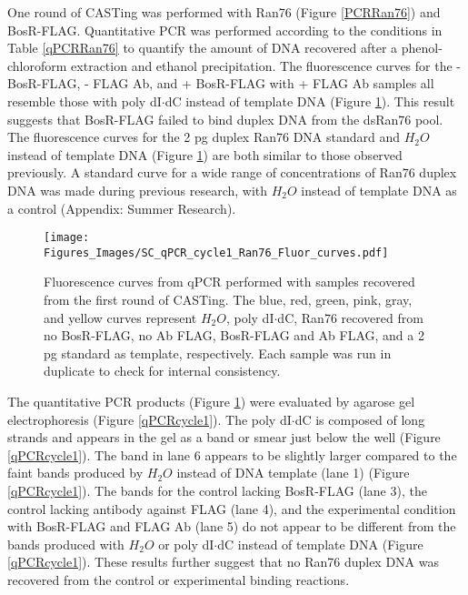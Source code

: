 \documentclass[12pt,twoside]{reedthesis}
\begin{document}
       One round of CASTing was performed with Ran76 (Figure \ref{PCRRan76}) and BosR-FLAG. Quantitative PCR was performed according to the conditions in Table \ref{qPCRRan76} to quantify the amount of DNA recovered after a phenol-chloroform extraction and ethanol precipitation. The fluorescence curves for the - BosR-FLAG, - FLAG Ab, and + BosR-FLAG with + FLAG Ab samples all resemble those with poly dI$\cdot$dC instead of template DNA (Figure \ref{qPCRcycle1fluorcurves}). This result suggests that BosR-FLAG failed to bind duplex DNA from the dsRan76 pool. The fluorescence curves for the 2 pg duplex Ran76 DNA standard and $H_{2}O$ instead of template DNA (Figure \ref{qPCRcycle1fluorcurves}) are both similar to those observed previously. A standard curve for a wide range of concentrations of Ran76 duplex DNA was made during previous research, with $H_{2}O$ instead of template DNA as a control (Appendix: Summer Research).
       
       
    \begin{figure}[t]
    	\centering
    	\texttt{[image: Figures\_Images/SC\_qPCR\_cycle1\_Ran76\_Fluor\_curves.pdf]}
    	\caption[qPCR of 1st Cycle of CASTing Fluorescence Curves]{Fluorescence curves from qPCR performed with samples recovered from the first round of CASTing. The blue, red, green, pink, gray, and yellow curves represent $H_{2}O$, poly dI$\cdot$dC, Ran76 recovered from no BosR-FLAG, no Ab FLAG, BosR-FLAG and Ab FLAG, and a 2 pg standard as template, respectively. Each sample was run in duplicate to check for internal consistency.}
    	\label{qPCRcycle1fluorcurves}
    \end{figure}
    
    
    The quantitative PCR products (Figure \ref{qPCRcycle1fluorcurves}) were evaluated by agarose gel electrophoresis (Figure \ref{qPCRcycle1}). The poly dI$\cdot$dC is composed of long strands and appears in the gel as a band or smear just below the well (Figure \ref{qPCRcycle1}). The band in lane 6 appears to be slightly larger compared to the faint bands produced by $H_{2}O$ instead of DNA template (lane 1) (Figure \ref{qPCRcycle1}). The bands for the control lacking BosR-FLAG (lane 3), the control lacking antibody against FLAG (lane 4), and the experimental condition with BosR-FLAG and FLAG Ab (lane 5) do not appear to be different from the bands produced with $H_{2}O$ or poly dI$\cdot$dC instead of template DNA (Figure \ref{qPCRcycle1}). These results further suggest that no Ran76 duplex DNA was recovered from the control or experimental binding reactions. 
    
\end{document}

